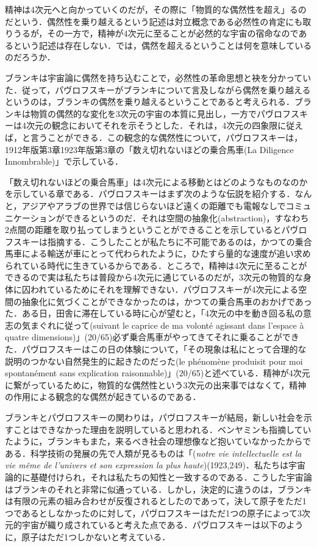 精神は4次元へと向かっていくのだが，その際に「物質的な偶然性を超え」るのだという．偶然性を乗り越えるという記述は対立概念である必然性の肯定にも取りうるが，その一方で，精神が4次元に至ることが必然的な宇宙の宿命なのであるという記述は存在しない．では，偶然を超えるということは何を意味しているのだろうか．

ブランキは宇宙論に偶然を持ち込むことで，必然性の革命思想と袂を分かっていた．従って，パヴロフスキーがブランキについて言及しながら偶然を乗り越えるというのは，ブランキの偶然を乗り越えるということであると考えられる．ブランキは物質の偶然的な変化を3次元の宇宙の本質に見出し，一方でパヴロフスキーは4次元の観念においてそれを示そうとした．それは，4次元の四象限に従えば，と言うことができる．この観念的な偶然性について，パヴロフスキーは，1912年版第3章1923年版第3章の「数え切れないほどの乗合馬車(La Diligence Innombrable)」で示している．

「数え切れないほどの乗合馬車」は4次元による移動とはどのようなものなのかを示している章である．パヴロフスキーはまず次のような伝説を紹介する．なんと，アジアやアラブの世界では信じらないほど遠くの距離でも電報なしでコミュニケーションができるというのだ．それは空間の抽象化(abstraction)，すなわち2点間の距離を取り払ってしまうということができることを示しているとパヴロフスキーは指摘する．こうしたことが私たちに不可能であるのは，かつての乗合馬車による輸送が車にとって代わられたように，ひたすら量的な速度が追い求められている時代に生きているからである．ところで，精神は4次元に至ることができるので実は私たちは普段から4次元に通じているのだが，3次元の物質的な身体に囚われているためにそれを理解できない．パヴロフスキーが4次元による空間の抽象化に気づくことができなかったのは，かつての乗合馬車のおかげであった．ある日，田舎に滞在している時に心が望むと，「4次元の中を動き回る私の意志の気まぐれに従って(suivant le caprice de ma volonté agissant dans l'espace à quatre dimensions)」(20/65)必ず乗合馬車がやってきてそれに乗ることができた．パヴロフスキーはこの日の体験について，「その現象は私にとって合理的な説明のつかない自然発生的に起きたのだった(le phénomène produisit pour moi spontanément sans explication raisonnable)」(20/65)と述べている．精神が4次元に繋がっているために，物質的な偶然性という3次元の出来事ではなくて，精神の作用による観念的な偶然が起きているのである．

ブランキとパヴロフスキーの関わりは，パヴロフスキーが結局，新しい社会を示すことはできなかった理由を説明していると思われる．ベンヤミンも指摘していたように，ブランキもまた，来るべき社会の理想像など抱いていなかったからである．科学技術の発展の先で人類が見るものは「(\emph{notre vie intellectuelle est la vie même de l'univers et son expression la plus haute})(1923,249)．私たちは宇宙論的に基礎付けられ，それは私たちの知性と一致するのである．こうした宇宙論はブランキのそれと非常に似通っている．しかし，決定的に違うのは，ブランキは有限の元素の組み合わせが反復されるとしたのであって，決して原子をただ1つであるとしなかったのに対して，パヴロフスキーはただ1つの原子によって3次元的宇宙が織り成されていると考えた点である．パヴロフスキーは以下のように，原子はただ1つしかないと考えている．

